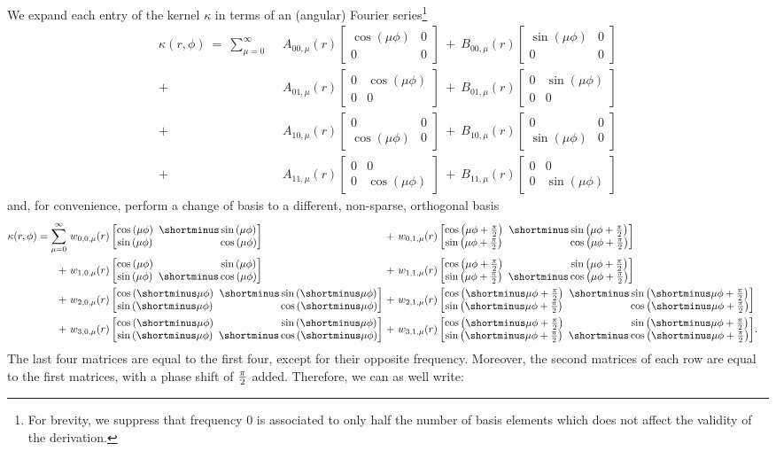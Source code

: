 \documentclass{article}
\newcommand{\lp}{\left(}
\newcommand{\rp}{\right)}
\newcommand{\PSI}[1]{
	\begin{bmatrix}
		\cos\lp#1\rp & \!\!\!         \shortminus \sin\lp#1\rp \\
		\sin\lp#1\rp & \!\!\!\phantom{\shortminus}\cos\lp#1\rp \\
	\end{bmatrix}
}
\newcommand{\PSIS}[1]{
	\begin{bmatrix}
		\cos\lp#1\rp & \!\!\!\phantom{\shortminus}\sin\lp#1\rp \\
		\sin\lp#1\rp & \!\!\!         \shortminus \cos\lp#1\rp \\
	\end{bmatrix}
}
\begin{document}
We expand each entry of the kernel $\kappa$ in terms of an (angular) Fourier series\footnote{
For brevity, we suppress that frequency 0 is associated to only half the number of basis elements which does not affect the validity of the derivation.
}
\begin{align*}
	\kappa(r, \phi)\ =\ \sum_{\mu=0}^{\infty}\ 
	 \ &A_{00,\mu}(r) \begin{bmatrix} \cos(\mu\phi) & 0 \\ 0 & 0 \end{bmatrix}\ 
	+\  B_{00,\mu}(r) \begin{bmatrix} \sin(\mu\phi) & 0 \\ 0 & 0 \end{bmatrix}\\
	+\ &A_{01,\mu}(r) \begin{bmatrix} 0 & \cos(\mu\phi) \\ 0 & 0 \end{bmatrix}\ 
	+\  B_{01,\mu}(r) \begin{bmatrix} 0 & \sin(\mu\phi) \\ 0 & 0 \end{bmatrix}\\
	+\ &A_{10,\mu}(r) \begin{bmatrix} 0 & 0 \\ \cos(\mu\phi) & 0 \end{bmatrix}\ 
	+\  B_{10,\mu}(r) \begin{bmatrix} 0 & 0 \\ \sin(\mu\phi) & 0 \end{bmatrix}\\
	+\ &A_{11,\mu}(r) \begin{bmatrix} 0 & 0 \\ 0 & \cos(\mu\phi) \end{bmatrix}\ 
	+\  B_{11,\mu}(r) \begin{bmatrix} 0 & 0 \\ 0 & \sin(\mu\phi) \end{bmatrix}
\end{align*}
and, for convenience, perform a change of basis to a different, non-sparse, orthogonal basis \begin{align*}
	\kappa(r, \phi) = \sum_{\mu=0}^{\infty}
	 \ & w_{0,0,\mu}(r) \PSI{\mu\phi}             \!\!\!\! &+&\ w_{0,1,\mu}(r) \PSI{\mu\phi + {\pi\over 2}} &&\\
	+\ & w_{1,0,\mu}(r) \PSIS{\mu\phi}            \!\!\!\! &+&\ w_{1,1,\mu}(r) \PSIS{\mu\phi + {\pi\over 2}} &&\\
	+\ & w_{2,0,\mu}(r) \PSI{\shortminus\mu\phi}  \!\!\!\! &+&\ w_{2,1,\mu}(r) \PSI{\shortminus\mu\phi + {\pi\over 2}} &&\\
	+\ & w_{3,0,\mu}(r) \PSIS{\shortminus\mu\phi} \!\!\!\! &+&\ w_{3,1,\mu}(r) \PSIS{\shortminus\mu\phi + {\pi\over 2}}\!.&&
\end{align*}
The last four matrices are equal to the first four, except for their opposite frequency.
Moreover, the second matrices of each row are equal to the first matrices, with a phase shift of ${\pi\over2}$ added.
Therefore, we can as well write:
\end{document}
